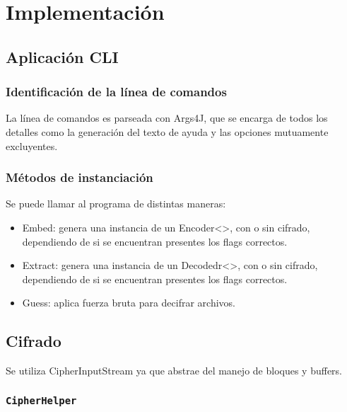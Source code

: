 \section{Implementación}
	
\subsection{Aplicación CLI}

\subsubsection{Identificación de la línea de comandos}
La línea de comandos es parseada con Args4J, que se encarga de todos los detalles como la generación del texto de ayuda y las opciones mutuamente excluyentes.

\subsubsection{Métodos de instanciación}
Se puede llamar al programa de distintas maneras:

\begin{itemize}
\item Embed: genera una instancia de un Encoder<>, con o sin cifrado, dependiendo de si se encuentran presentes los flags correctos.

\item Extract: genera una instancia de un Decodedr<>, con o sin cifrado, dependiendo de si se encuentran presentes los flags correctos.

\item Guess: aplica fuerza bruta para decifrar archivos.
\end{itemize}

\subsection{Cifrado}
Se utiliza CipherInputStream ya que abstrae del manejo de bloques y buffers.
\subsubsection{\texttt{CipherHelper}}